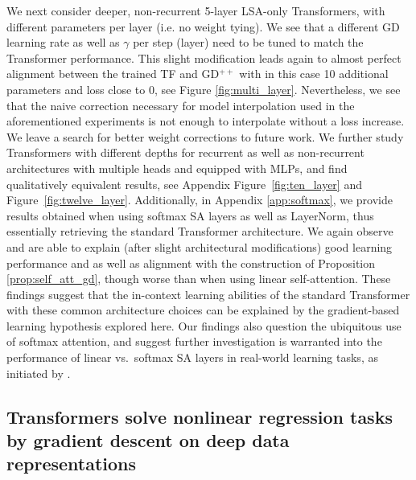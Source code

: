 \documentclass{article}
\theoremstyle{plain}
\theoremstyle{definition}
\theoremstyle{remark}
\begin{document}
We next consider deeper, non-recurrent 5-layer LSA-only Transformers, with different parameters per layer (i.e. no weight tying). We see that a different GD learning rate as well as $\gamma$ per step (layer) need to be tuned to match the Transformer performance. This slight modification leads again to almost perfect alignment between the trained TF and GD$^{++}$ with in this case 10 additional parameters and loss close to 0, see Figure \ref{fig:multi_layer}.
Nevertheless, we see that the naive correction necessary for model interpolation used in the aforementioned experiments is not enough to interpolate without a loss increase. We leave a search for better weight corrections to future work. We further study Transformers with different depths for recurrent as well as non-recurrent architectures with multiple heads and equipped with MLPs, and find qualitatively equivalent results, see Appendix Figure~\ref{fig:ten_layer} and Figure~\ref{fig:twelve_layer}. Additionally, in Appendix \ref{app:softmax}, we provide results obtained when using softmax SA layers as well as LayerNorm, thus essentially retrieving the standard Transformer architecture. We again observe and are able to explain (after slight architectural modifications) good learning performance and as well as alignment with the construction of Proposition \ref{prop:self_att_gd}, though worse than when using linear self-attention. These findings suggest that the in-context learning abilities of the standard Transformer with these common architecture choices can be explained by the gradient-based learning hypothesis explored here. Our findings also question the ubiquitous use of softmax attention, and suggest further investigation is warranted into the performance of linear vs.~softmax SA layers in real-world learning tasks, as initiated by \citet{linear_transformers_fast_weight}.

\subsection*{Transformers solve nonlinear regression tasks by gradient descent on deep data representations}
\end{document}
